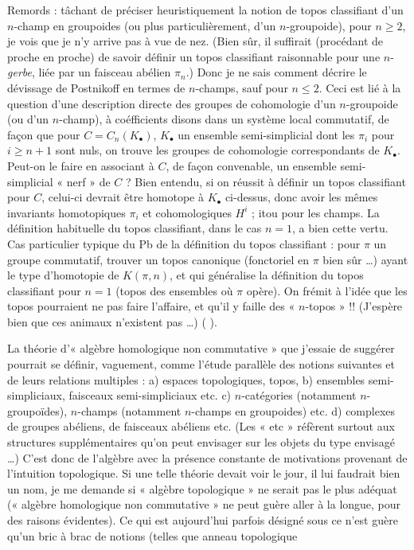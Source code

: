 \documentclass[11pt,a4paper]{article}
\begin{document}
Remords : tâchant de préciser heuristiquement la notion de topos classifiant d'un $n$-champ en groupoides (ou plus particulièrement, d'un $n$-groupoide), pour $n \geqslant 2$, je vois que je n'y arrive pas à vue de nez. (Bien sûr, il suffirait (procédant de proche en proche) de savoir définir un topos classifiant raisonnable pour une $n$-\emph{gerbe}, liée par un faisceau abélien $\pi_n$.) Donc je ne sais comment décrire le dévissage de Postnikoff en termes de $n$-champs, sauf pour $n \leqslant 2$. Ceci est lié à la question d'une description directe des groupes de cohomologie d'un $n$-groupoide  (ou d'un $n$-champ), à coéfficients disons dans un système local commutatif, de façon que pour $C = C_n(K_\bullet)$, $K_\bullet$ un ensemble semi-simplicial dont les $\pi_i$ pour $i \geqslant n+1$ sont nuls, on trouve les groupes de cohomologie correspondants de $K_\bullet$. Peut-on le faire en associant à $C$, de façon convenable, un ensemble semi-simplicial « nerf » de $C$ ? Bien entendu, si on réussit à définir un topos classifiant pour $C$, celui-ci devrait être homotope à $K_\bullet$ ci-dessus, donc avoir les mêmes invariants homotopiques $\pi_i$ et cohomologiques $H^i$ ; itou pour les champs. La définition habituelle du topos classifiant, dans le cas $n = 1$, a bien cette vertu. Cas particulier typique du Pb de la définition du topos classifiant : pour $\pi$ un groupe commutatif, trouver un topos canonique (fonctoriel en $\pi$ bien sûr …) ayant le type d'homotopie de $K(\pi, n)$, et qui généralise la définition du topos classifiant pour $n = 1$ (topos des ensembles où $\pi$ opère). On frémit à l'idée que les topos pourraient ne pas faire l'affaire, et qu'il y faille des « $n$-topos » !! (J'espère bien que ces animaux n'existent pas …) ( ).

La théorie d'« algèbre homologique non commutative » que j'essaie de suggérer pourrait se définir, vaguement, comme l'étude parallèle des notions suivantes et de leurs relations multiples : a) espaces topologiques, topos, b) ensembles semi-simpliciaux, faisceaux semi-simpliciaux etc. c) $n$-catégories (notamment $n$-groupoïdes), $n$-champs (notamment $n$-champs en groupoides) etc. d) complexes de groupes abéliens, de faisceaux abéliens etc. (Les « etc » réfèrent surtout aux structures supplémentaires qu'on peut envisager sur les objets du type envisagé …) C'est donc de l'algèbre avec la présence constante de motivations provenant de l'intuition topologique. Si une telle théorie devait voir le jour, il lui faudrait bien un nom, je me demande si « algèbre topologique » ne serait pas le plus adéquat (« algèbre homologique non commutative » ne peut guère aller à la longue, pour des raisons évidentes). Ce qui est aujourd'hui parfois désigné sous ce  n'est guère qu'un bric à brac de notions (telles que anneau topologique
\end{document}
